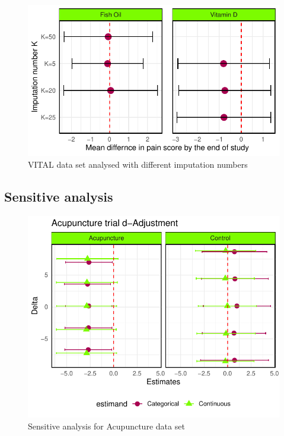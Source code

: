 \documentclass{article}
\newcommand{\pandocbounded}[1]{#1}
\begin{document}
\begin{figure}
\centering
\pandocbounded{\includegraphics[keepaspectratio]{Final_Report_files/figure-latex/unnamed-chunk-41-1.pdf}}
\caption{VITAL data set analysed with different imputation numbers}
\end{figure}

\subsection{Sensitive analysis}\label{sensitive-analysis-1}

\begin{figure}
\centering
\pandocbounded{\includegraphics[keepaspectratio]{Final_Report_files/figure-latex/unnamed-chunk-42-1.pdf}}
\caption{Sensitive analysis for Acupuncture data set}
\end{figure}
\end{document}

